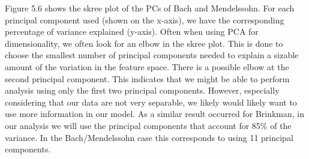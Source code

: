 \documentclass[12pt,twoside]{reedthesis}
\theoremstyle{definition}
\theoremstyle{definition}
\theoremstyle{definition}
\theoremstyle{remark}
\begin{document}
Figure 5.6 shows the skree plot of the PCs of Bach and Mendelssohn. For
each principal component used (shown on the x-axis), we have the
corresponding percentage of variance explained (y-axis). Often when
using PCA for dimensionality, we often look for an elbow in the skree
plot. This is done to choose the smallest number of principal components
needed to explain a sizable amount of the variation in the feature
space. There is a possible elbow at the second principal component. This
indicates that we might be able to perform analysis using only the first
two principal components. However, especially considering that our data
are not very separable, we likely would likely want to use more
information in our model. As a similar result occurred for Brinkman, in
our analysis we will use the principal components that account for 85\%
of the variance. In the Bach/Mendelssohn case this corresponds to using
11 principal components.
\end{document}
